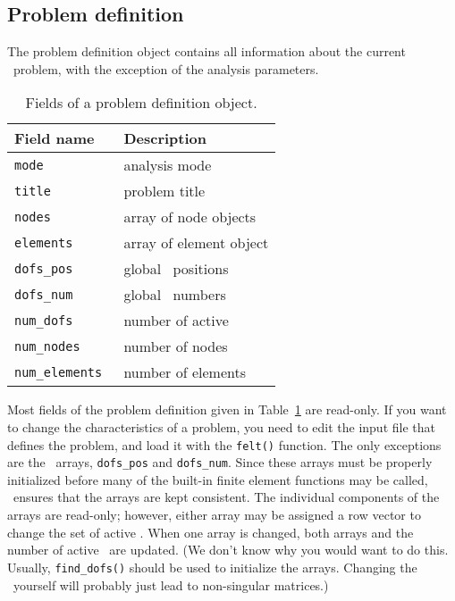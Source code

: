 \subsection{Problem definition}

The problem definition object contains all information about the
current \felt\ problem, with the exception of the analysis parameters.

{\scriptsize
\begin{table}[hpbt]
\begin{center}
\begin{tabular}{l|l}
Field name		& Description			\\
\hline
\tt mode		& analysis mode			\\
\tt title		& problem title			\\
\tt nodes		& array of node objects		\\
\tt elements		& array of element object	\\
\tt dofs\_pos		& global \dof\ positions	\\
\tt dofs\_num		& global \dof\ numbers		\\
\tt num\_dofs		& number of active \dofs	\\
\tt num\_nodes		& number of nodes		\\
\tt num\_elements	& number of elements		\\
\end{tabular}
\caption{Fields of a problem definition object.}
\label{burlap.problem.fields}
\end{center}
\end{table}}

Most fields of the problem definition given in
Table~\ref{burlap.problem.fields} are read-only.  If you want to
change the characteristics of a problem, you need to edit the input
file that defines the problem, and load it with the {\tt felt()}
function.  The only exceptions are the \dof\ arrays, {\tt dofs\_pos}
and {\tt dofs\_num}.  Since these arrays must be properly initialized
before many of the built-in finite element functions may be called,
\burlap\ ensures that the arrays are kept consistent.  The
individual components of the arrays are read-only; however, either
array may be assigned a row vector to change the set of active \dofs.
When one array is changed, both arrays and the number of active \dofs\
are updated.  (We don't know why you would want to do this.  Usually,
{\tt find\_dofs()} should be used to initialize the arrays.  Changing
the \dofs\ yourself will probably just lead to non-singular matrices.)



